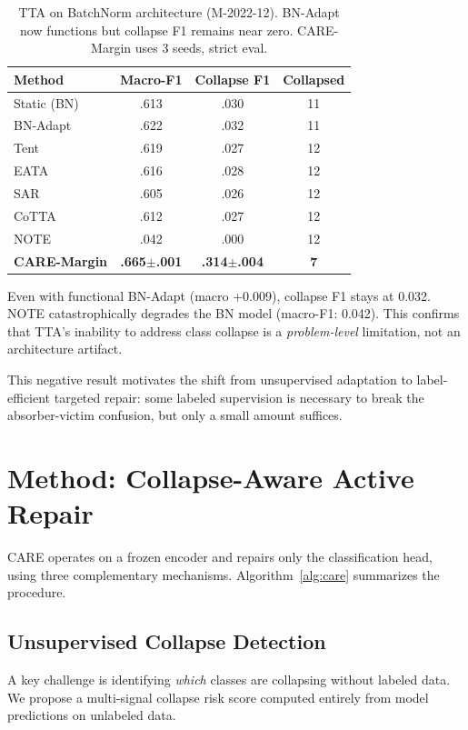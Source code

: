 \documentclass[journal]{IEEEtran}
\newcommand{\ours}{CARE}  %
\begin{document}
\begin{table}[t]
\centering
\caption{TTA on BatchNorm architecture (M-2022-12). BN-Adapt now functions but collapse F1 remains near zero. \ours{}-Margin uses 3 seeds, strict eval.}
\label{tab:bn_tta}
\small
\begin{tabular}{@{}l ccc@{}}
\toprule
Method & Macro-F1 & Collapse F1 & Collapsed \\
\midrule
Static (BN) & .613 & .030 & 11 \\
BN-Adapt & .622 & .032 & 11 \\
Tent & .619 & .027 & 12 \\
EATA & .616 & .028 & 12 \\
SAR & .605 & .026 & 12 \\
CoTTA & .612 & .027 & 12 \\
NOTE & .042 & .000 & 12 \\
\midrule
\textbf{\ours{}-Margin} & \textbf{.665$\pm$.001} & \textbf{.314$\pm$.004} & \textbf{7} \\
\bottomrule
\end{tabular}
\end{table}

Even with functional BN-Adapt (macro +0.009), collapse F1 stays at 0.032. NOTE catastrophically degrades the BN model (macro-F1: 0.042).
This confirms that TTA's inability to address class collapse is a \textit{problem-level} limitation, not an architecture artifact.

This negative result motivates the shift from unsupervised adaptation to label-efficient targeted repair: some labeled supervision is necessary to break the absorber-victim confusion, but only a small amount suffices.


\section{Method: Collapse-Aware Active Repair}
\label{sec:method}

\ours{} operates on a frozen encoder and repairs only the classification head, using three complementary mechanisms.
Algorithm~\ref{alg:care} summarizes the procedure.

\subsection{Unsupervised Collapse Detection}
\label{sec:unsup_detect}

A key challenge is identifying \textit{which} classes are collapsing without labeled data.
We propose a multi-signal collapse risk score computed entirely from model predictions on unlabeled data.
\end{document}
